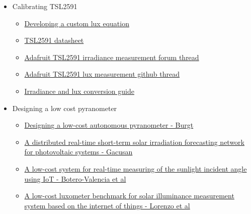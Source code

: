 \begin{itemize}
    \item Calibrating TSL2591
    \begin{itemize}
        \item \href{https://ams.com/documents/20143/36005/AmbientLightSensors_AN000173_2-00.pdf/ce3360f8-fb85-bc22-0bad-b60d3b31efc8}{Developing a custom lux equation}
        \item \href{https://cdn-learn.adafruit.com/assets/assets/000/078/658/original/TSL2591_DS000338_6-00.pdf?1564168468}{TSL2591 datasheet}
        \item \href{https://forums.adafruit.com/viewtopic.php?t=151217}{Adafruit TSL2591 irradiance measurement forum thread}
        \item \href{https://github.com/adafruit/Adafruit_CircuitPython_TSL2591/issues/7#issuecomment-437404689}{Adafruit TSL2591 lux measurement github thread}
        \item \href{https://www.extrica.com/article/21667}{Irradiance and lux conversion guide}
    \end{itemize}
    \item Designing a low cost pyranometer
    \begin{itemize}
        \item \href{https://essay.utwente.nl/82693/1/86293_Burgt_BA_EEMCS.pdf}{Designing a low-cost autonomous pyranometer - Burgt}
        \item \href{https://digitalscholarship.unlv.edu/cgi/viewcontent.cgi?article=4492&context=thesesdissertations}{A distributed real-time short-term solar irradiation forecasting network for photovoltaic systems - Gacusan}
        \item \href{https://www.ncbi.nlm.nih.gov/pmc/articles/PMC9058727/}{A low-cost system for real-time measuring of the sunlight incident angle using IoT - Botero-Valencia et al}
        \item \href{https://www.mdpi.com/1424-8220/22/19/7107}{A low-cost luxometer benchmark for solar illuminance measurement system based on the internet of things - Lorenzo et al}
    \end{itemize}
\end{itemize}
